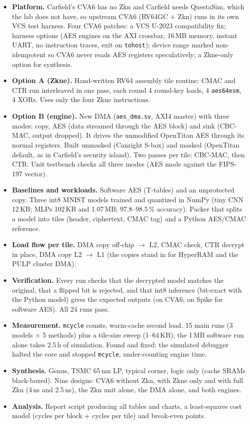 \documentclass[10pt]{article}
\begin{document}
\begin{itemize}\itemsep1pt
\item \textbf{Platform.} Carfield's CVA6 has no Zkn and Carfield needs QuestaSim, which the lab does not have, so upstream CVA6
  (RV64GC + Zkn) runs in its own VCS test harness. Four CVA6 patches: a VCS U-2023 compatibility fix; harness options
  (AES engines on the AXI crossbar, 16\,MB memory, instant UART, no instruction traces, exit on \texttt{tohost});
  device range marked non-idempotent so CVA6 never reads AES registers speculatively; a Zkne-only option for synthesis.
\item \textbf{Option A (Zkne).} Hand-written RV64 assembly tile routine: CMAC and CTR run interleaved in one pass, each
  round 4 round-key loads, 4 \texttt{aes64esm}, 4 XORs. Uses only the four Zkne instructions.
\item \textbf{Option B (engine).} New DMA (\texttt{aes\_dma.sv}, AXI4 master) with three modes: copy, AES (data streamed
  through the AES block) and sink (CBC-MAC, output dropped). It drives the unmodified OpenTitan AES through its normal
  registers. Built unmasked (Canright S-box) and masked (OpenTitan default, as in Carfield's security island).
  Two passes per tile: CBC-MAC, then CTR. Unit testbench checks all three modes (AES mode against the FIPS-197 vector).
\item \textbf{Baselines and workloads.} Software AES (T-tables) and an unprotected copy. Three int8 MNIST models trained
  and quantized in NumPy (tiny CNN 12\,KB; MLPs 102\,KB and 1.07\,MB; 97.8--98.5\,\% accuracy). Packer that splits a model
  into tiles (header, ciphertext, CMAC tag) and a Python AES/CMAC reference.
\item \textbf{Load flow per tile.} DMA copy off-chip $\to$ L2, CMAC check, CTR decrypt in place, DMA copy L2 $\to$ L1
  (the copies stand in for HyperRAM and the PULP cluster DMA).
\item \textbf{Verification.} Every run checks that the decrypted model matches the original, that a flipped bit is
  rejected, and that int8 inference (bit-exact with the Python model) gives the expected outputs (on CVA6; on Spike for
  software AES). All 24 runs pass.
\item \textbf{Measurement.} \texttt{mcycle} counts, warm-cache second load. 15 main runs (3 models $\times$ 5 methods)
  plus a tile-size sweep (1--64\,KB); the 1\,MB software run alone takes 2.5\,h of simulation.
  Found and fixed: the simulated debugger halted the core and stopped \texttt{mcycle}, under-counting engine time.
\item \textbf{Synthesis.} Genus, TSMC 65\,nm LP, typical corner, logic only (cache SRAMs black-boxed). Nine designs:
  CVA6 without Zkn, with Zkne only and with full Zkn (4\,ns and 2.5\,ns), the Zkn unit alone, the DMA alone, and both engines.
\item \textbf{Analysis.} Report script producing all tables and charts, a least-squares cost model
  (cycles per block + cycles per tile) and break-even points.
\end{itemize}
\end{document}
